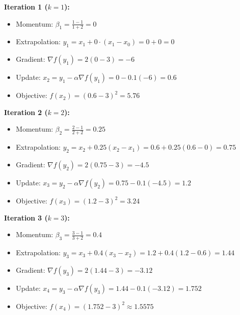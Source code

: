 \documentclass[11pt]{article}
\begin{document}
\textbf{Iteration 1 ($k=1$):}
\begin{itemize}
    \item Momentum: $\beta_1 = \frac{1-1}{1+2} = 0$
    \item Extrapolation: $y_1 = x_1 + 0 \cdot (x_1 - x_0) = 0 + 0 = 0$
    \item Gradient: $\nabla f(y_1) = 2(0-3) = -6$
    \item Update: $x_2 = y_1 - \alpha \nabla f(y_1) = 0 - 0.1(-6) = 0.6$
    \item Objective: $f(x_2) = (0.6 - 3)^2 = 5.76$
\end{itemize}

\textbf{Iteration 2 ($k=2$):}
\begin{itemize}
    \item Momentum: $\beta_2 = \frac{2-1}{2+2} = 0.25$
    \item Extrapolation: $y_2 = x_2 + 0.25(x_2 - x_1) = 0.6 + 0.25(0.6 - 0) = 0.75$
    \item Gradient: $\nabla f(y_2) = 2(0.75-3) = -4.5$
    \item Update: $x_3 = y_2 - \alpha \nabla f(y_2) = 0.75 - 0.1(-4.5) = 1.2$
    \item Objective: $f(x_3) = (1.2 - 3)^2 = 3.24$
\end{itemize}

\textbf{Iteration 3 ($k=3$):}
\begin{itemize}
    \item Momentum: $\beta_3 = \frac{3-1}{3+2} = 0.4$
    \item Extrapolation: $y_3 = x_3 + 0.4(x_3 - x_2) = 1.2 + 0.4(1.2 - 0.6) = 1.44$
    \item Gradient: $\nabla f(y_3) = 2(1.44-3) = -3.12$
    \item Update: $x_4 = y_3 - \alpha \nabla f(y_3) = 1.44 - 0.1(-3.12) = 1.752$
    \item Objective: $f(x_4) = (1.752 - 3)^2 \approx 1.5575$
\end{itemize}
\end{document}
